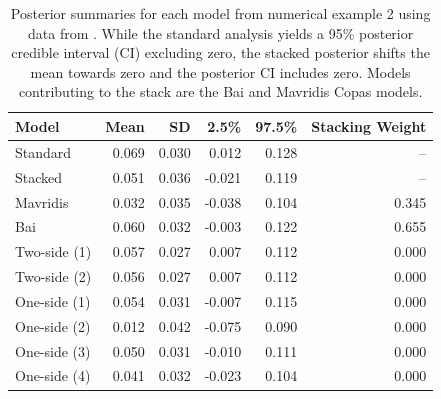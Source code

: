 \documentclass[12pt]{article}   	%
\numberwithin{equation}{section}
\begin{document}
\begin{table}[ht]
\centering
\begin{tabular}{lrrrrr}
  \hline
Model & Mean & SD & 2.5\% & 97.5\% & Stacking Weight \\ 
  \hline
Standard & 0.069 & 0.030 & 0.012 & 0.128 & -- \\ 
  Stacked & 0.051 & 0.036 & -0.021 & 0.119 & -- \\ 
  Mavridis & 0.032 & 0.035 & -0.038 & 0.104 & 0.345 \\ 
  Bai & 0.060 & 0.032 & -0.003 & 0.122 & 0.655 \\ 
  Two-side (1) & 0.057 & 0.027 & 0.007 & 0.112 & 0.000 \\ 
  Two-side (2) & 0.056 & 0.027 & 0.007 & 0.112 & 0.000 \\ 
  One-side (1) & 0.054 & 0.031 & -0.007 & 0.115 & 0.000 \\ 
  One-side (2) & 0.012 & 0.042 & -0.075 & 0.090 & 0.000 \\ 
  One-side (3) & 0.050 & 0.031 & -0.010 & 0.111 & 0.000 \\ 
  One-side (4) & 0.041 & 0.032 & -0.023 & 0.104 & 0.000 \\ 
   \hline
\end{tabular}
\caption{Posterior summaries for each model from numerical example 2 using data from \citet{bornmann2007gender}. While the standard analysis yields a 95\% posterior credible interval (CI) excluding zero, the stacked posterior shifts the mean towards zero and the posterior CI includes zero. Models contributing to the stack are the Bai and Mavridis Copas models.}
\label{tab:bornmann}
\end{table}
\end{document}
